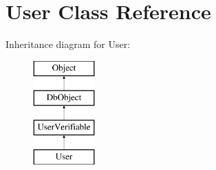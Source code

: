 \hypertarget{class_user}{\section{User Class Reference}
\label{class_user}
}
Inheritance diagram for User\-:\begin{figure}[H]
\begin{center}
\leavevmode
\includegraphics[height=4.000000cm]{class_user}
\end{center}
\end{figure}
